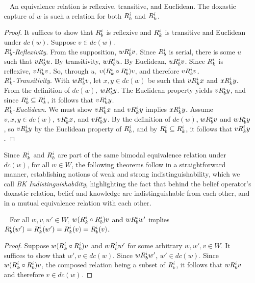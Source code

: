 \begin{theorem}~\label{dc_equiv}
	An equivalence relation is reflexive, transitive, and Euclidean. The doxastic capture of $w$ is such a relation for both $R_{b}^i$ and $R_{k}^i$.
\end{theorem}
\begin{proof}
	It suffices to show that $R_{b}^i$ is reflexive and $R_{k}^i$ is transitive and Euclidean under $dc(w)$. Suppose $v\in dc(w)$.\\ 
	$R_{b}^i$-\emph{Reflexivity}. From the supposition, $wR_{b}^iv$. Since $R_{b}^i$ is serial, there is some $u$ such that $vR_{b}^iu$. By transitivity, $wR_{b}^iu$. By Euclidean, $uR_{b}^iv$. Since $R_{k}^i$ is reflexive, $vR_{k}^iv$. So, through $u$, $v(R_{k}^i \circ R_{b}^i)v$, and therefore $vR_{b}^iv$.\\
	$R_{k}^i$-\emph{Transitivity}. With $wR_{b}^iv$, let $x,y \in dc(w)$ be such that $vR_{k}^ix$ and $xR_{k}^iy$. From the definition of $dc(w)$, $wR_{b}^iy$. The Euclidean property yields $vR_{b}^iy$, and since $R_{b}^i\subseteq R_{k}^i$, it follows that $vR_{k}^iy$.\\
	$R_{k}^i$-\emph{Euclidean}. We must show $vR_{k}^ix$ and $vR_{k}^iy$ implies $xR_{k}^iy$. Assume $v,x,y \in dc(w)$, $vR_{k}^ix$, and $vR_{k}^iy$. By the definition of $dc(w)$, $wR_{b}^iv$ and $wR_{b}^iy$, so $vR_{b}^iy$ by the Euclidean property of $R_{b}^i$, and by $R_{b}^i \subseteq R_{k}^i$, it follows that $vR_{k}^iy$.
\end{proof}

Since $R_{k}^i$ and $R_{b}^i$ are part of the same bimodal equivalence relation under $dc(w)$, for all $w\in W$, the following theorems follow in a straightforward manner, establishing notions of weak and strong indistinguishability, which we call \emph{BK Indistinguishability}, highlighting the fact that behind the belief operator's doxastic relation, belief and knowledge are indistinguishable from each other, and in a mutual equivalence relation with each other.

\begin{theorem}~\label{weak_equiv}
	For all $w,v,w' \in W$, $w(R_{k}^i \circ R_{b}^i)v$ and $wR_{b}^iw'$ implies $R_{b}^i(w') = R_{k}^i(w') = R_{k}^i(v) = R_{b}^i(v)$.
\end{theorem}
\begin{proof}
	Suppose $w(R_{k}^i \circ R_{b}^i)v$ and $wR_{b}^iw'$ for some arbitrary $w,w',v\in W$. It suffices to show that $w',v \in dc(w)$. Since $wR_{b}^iw'$, $w'\in dc(w)$. Since $w(R_{k}^i \circ R_{b}^i)v$, the composed relation being a subset of $R_{b}^i$, it follows that $wR_{b}^iv$ and therefore $v \in dc(w)$.
\end{proof}

